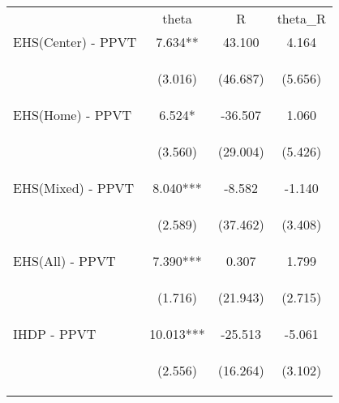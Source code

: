 \begin{tabular}{lccc}
\hline \noalign{\smallskip} & theta & R & theta\_R\\
\noalign{\smallskip}\hline \noalign{\smallskip}EHS(Center) - PPVT & 7.634** & 43.100 & 4.164\\
 & \begin{footnotesize}(3.016)\end{footnotesize} & \begin{footnotesize}(46.687)\end{footnotesize} & \begin{footnotesize}(5.656)\end{footnotesize}\\
\noalign{\smallskip}EHS(Home) - PPVT & 6.524* & -36.507 & 1.060\\
 & \begin{footnotesize}(3.560)\end{footnotesize} & \begin{footnotesize}(29.004)\end{footnotesize} & \begin{footnotesize}(5.426)\end{footnotesize}\\
\noalign{\smallskip}EHS(Mixed) - PPVT & 8.040*** & -8.582 & -1.140\\
 & \begin{footnotesize}(2.589)\end{footnotesize} & \begin{footnotesize}(37.462)\end{footnotesize} & \begin{footnotesize}(3.408)\end{footnotesize}\\
\noalign{\smallskip}EHS(All) - PPVT & 7.390*** & 0.307 & 1.799\\
 & \begin{footnotesize}(1.716)\end{footnotesize} & \begin{footnotesize}(21.943)\end{footnotesize} & \begin{footnotesize}(2.715)\end{footnotesize}\\
\noalign{\smallskip}IHDP - PPVT & 10.013*** & -25.513 & -5.061\\
 & \begin{footnotesize}(2.556)\end{footnotesize} & \begin{footnotesize}(16.264)\end{footnotesize} & \begin{footnotesize}(3.102)\end{footnotesize}\\

\end{tabular}
